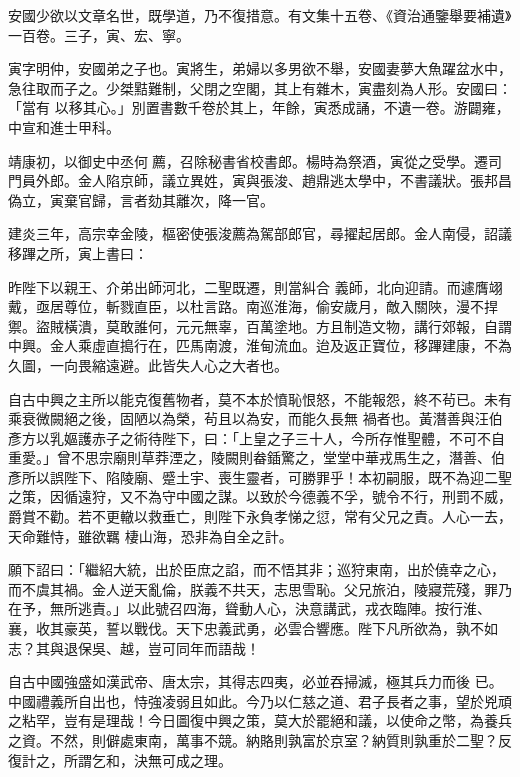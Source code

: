 \begin{pinyinscope}
 安國少欲以文章名世，既學道，乃不復措意。有文集十五卷、《資治通鑒舉要補遺》一百卷。三子，寅、宏、寧。



 寅字明仲，安國弟之子也。寅將生，弟婦以多男欲不舉，安國妻夢大魚躍盆水中，急往取而子之。少桀黠難制，父閉之空閣，其上有雜木，寅盡刻為人形。安國曰：「當有
 以移其心。」別置書數千卷於其上，年餘，寅悉成誦，不遺一卷。游闢雍，中宣和進士甲科。



 靖康初，以御史中丞何𣓨薦，召除秘書省校書郎。楊時為祭酒，寅從之受學。遷司門員外郎。金人陷京師，議立異姓，寅與張浚、趙鼎逃太學中，不書議狀。張邦昌偽立，寅棄官歸，言者劾其離次，降一官。



 建炎三年，高宗幸金陵，樞密使張浚薦為駕部郎官，尋擢起居郎。金人南侵，詔議移蹕之所，寅上書曰：



 昨陛下以親王、介弟出師河北，二聖既遷，則當糾合
 義師，北向迎請。而遽膺翊戴，亟居尊位，斬戮直臣，以杜言路。南巡淮海，偷安歲月，敵入關陜，漫不捍禦。盜賊橫潰，莫敢誰何，元元無辜，百萬塗地。方且制造文物，講行郊報，自謂中興。金人乘虛直搗行在，匹馬南渡，淮甸流血。迨及返正寶位，移蹕建康，不為久圖，一向畏縮遠避。此皆失人心之大者也。



 自古中興之主所以能克復舊物者，莫不本於憤恥恨怒，不能報怨，終不茍已。未有乘衰微闕絕之後，固陋以為榮，茍且以為安，而能久長無
 禍者也。黃潛善與汪伯彥方以乳嫗護赤子之術待陛下，曰：「上皇之子三十人，今所存惟聖體，不可不自重愛。」曾不思宗廟則草莽湮之，陵闕則畚鍤驚之，堂堂中華戎馬生之，潛善、伯彥所以誤陛下、陷陵廟、蹙土宇、喪生靈者，可勝罪乎！本初嗣服，既不為迎二聖之策，因循遠狩，又不為守中國之謀。以致於今德義不孚，號令不行，刑罰不威，爵賞不勸。若不更轍以救垂亡，則陛下永負孝悌之愆，常有父兄之責。人心一去，天命難恃，雖欲羈
 棲山海，恐非為自全之計。



 願下詔曰：「繼紹大統，出於臣庶之諂，而不悟其非；巡狩東南，出於僥幸之心，而不虞其禍。金人逆天亂倫，朕義不共天，志思雪恥。父兄旅泊，陵寢荒殘，罪乃在予，無所逃責。」以此號召四海，聳動人心，決意講武，戎衣臨陣。按行淮、襄，收其豪英，誓以戰伐。天下忠義武勇，必雲合響應。陛下凡所欲為，孰不如志？其與退保吳、越，豈可同年而語哉！



 自古中國強盛如漢武帝、唐太宗，其得志四夷，必並吞掃滅，極其兵力而後
 已。中國禮義所自出也，恃強凌弱且如此。今乃以仁慈之道、君子長者之事，望於兇頑之粘罕，豈有是理哉！今日圖復中興之策，莫大於罷絕和議，以使命之幣，為養兵之資。不然，則僻處東南，萬事不競。納賂則孰富於京室？納質則孰重於二聖？反復計之，所謂乞和，決無可成之理。




\end{pinyinscope}
